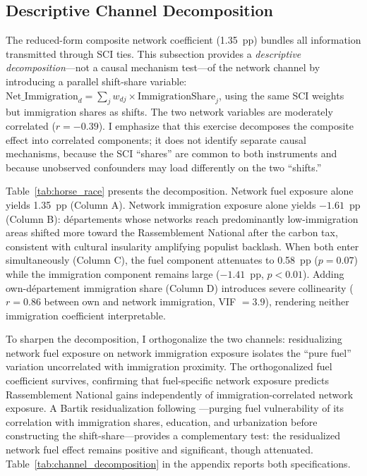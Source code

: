 \documentclass[12pt]{article}
\newcommand{\rn}{Rassemblement National}
\newcommand{\dept}{d\'{e}partement}
\newcommand{\depts}{d\'{e}partements}
\begin{document}
\subsection{Descriptive Channel Decomposition}
\label{sec:horse_race}

The reduced-form composite network coefficient (1.35~pp) bundles all information transmitted through SCI ties. This subsection provides a \emph{descriptive decomposition}---not a causal mechanism test---of the network channel by introducing a parallel shift-share variable: $\text{Net\_Immigration}_d = \sum_j w_{dj} \times \text{ImmigrationShare}_j$, using the same SCI weights but immigration shares as shifts. The two network variables are moderately correlated ($r = -0.39$). I emphasize that this exercise decomposes the composite effect into correlated components; it does not identify separate causal mechanisms, because the SCI ``shares'' are common to both instruments and because unobserved confounders may load differently on the two ``shifts.''

Table~\ref{tab:horse_race} presents the decomposition. Network fuel exposure alone yields 1.35~pp (Column A). Network immigration exposure alone yields $-1.61$~pp (Column B): \depts{} whose networks reach predominantly low-immigration areas shifted more toward the \rn{} after the carbon tax, consistent with cultural insularity amplifying populist backlash. When both enter simultaneously (Column C), the fuel component attenuates to 0.58~pp ($p = 0.07$) while the immigration component remains large ($-1.41$~pp, $p < 0.01$). Adding own-\dept{} immigration share (Column D) introduces severe collinearity ($r = 0.86$ between own and network immigration, VIF $= 3.9$), rendering neither immigration coefficient interpretable.



To sharpen the decomposition, I orthogonalize the two channels: residualizing network fuel exposure on network immigration exposure isolates the ``pure fuel'' variation uncorrelated with immigration proximity. The orthogonalized fuel coefficient survives, confirming that fuel-specific network exposure predicts \rn{} gains independently of immigration-correlated network exposure. A Bartik residualization following \citet{borusyak2022quasi}---purging fuel vulnerability of its correlation with immigration shares, education, and urbanization before constructing the shift-share---provides a complementary test: the residualized network fuel effect remains positive and significant, though attenuated. Table~\ref{tab:channel_decomposition} in the appendix reports both specifications.
\end{document}

